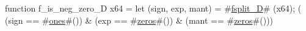 function f_is_neg_zero_D   x64 = {
  let (sign, exp, mant) = #\hyperref[sailRISCVzfsplitzyD]{fsplit\_D}# (x64);
  (  (sign == #\hyperref[sailRISCVzones]{ones}#())
   & (exp  == #\hyperref[sailRISCVzzzeros]{zeros}#())
   & (mant == #\hyperref[sailRISCVzzzeros]{zeros}#()))
}
